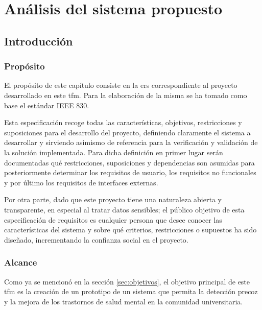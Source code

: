 \chapter{Análisis del sistema propuesto}
\label{chapter:analisis}


\section{Introducción}

    \subsection{Propósito}
        El propósito de este capítulo consiste en la \gls{ers} correspondiente al proyecto desarrollado en este \gls{tfm}. Para la elaboración de la misma se ha tomado como base el estándar IEEE 830.

        Esta especificación recoge todas las características, objetivos, restricciones y suposiciones para el desarrollo del proyecto, definiendo claramente el sistema a desarrollar y sirviendo asimismo de referencia para la verificación y validación de la solución implementada. Para dicha definición en primer lugar serán documentadas qué restricciones, suposiciones y dependencias son asumidas para posteriormente determinar los requisitos de usuario, los requisitos no funcionales y por último los requisitos de interfaces externas.


        Por otra parte, dado que este proyecto tiene una naturaleza abierta y transparente, en especial al tratar datos sensibles; el público objetivo de esta especificación de requisitos es cualquier persona que desee conocer las características del sistema y sobre qué criterios, restricciones o supuestos ha sido diseñado, incrementando la confianza social en el proyecto.
        
    \subsection{Alcance}
        \label{req:intro:alcance}
        Como ya se mencionó en la sección \ref{sec:objetivos}, el objetivo principal de este \gls{tfm} es la creación de un prototipo de un sistema que permita la detección precoz y la mejora de los trastornos de salud mental en la comunidad universitaria. 

